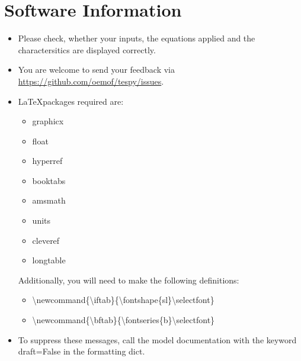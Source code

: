 \documentclass[]{article}
\begin{document}
\section*{Software Information}

\begin{itemize}
\item Please check, whether your inputs, the equations applied and the charactersitics are displayed correctly.
\item You are welcome to send your feedback via \url{https://github.com/oemof/tespy/issues}.
\item \LaTeX packages required are:
\begin{itemize}
\item graphicx
\item float
\item hyperref
\item booktabs
\item amsmath
\item units
\item cleveref
\item longtable
\end{itemize}
Additionally, you will need to make the following definitions:
\begin{itemize}
\item \textbackslash newcommand\{\textbackslash iftab\}\{\textbackslash fontshape\{sl\}\textbackslash selectfont\}
\item \textbackslash newcommand\{\textbackslash bftab\}\{\textbackslash fontseries\{b\}\textbackslash selectfont\}
\end{itemize}
\item To suppress these messages, call the model documentation with the keyword draft=False in the formatting dict.
\end{itemize}
\end{document}
